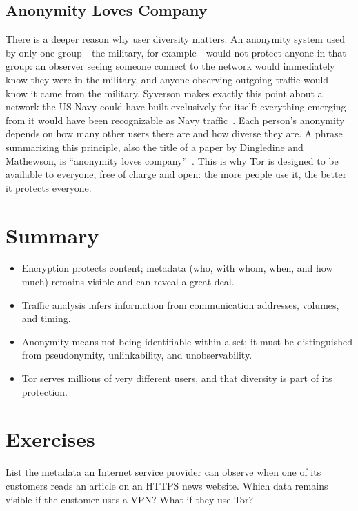 \subsection{Anonymity Loves Company}

There is a deeper reason why user diversity matters. An anonymity system used by only one group---the military, for example---would not protect anyone in that group: an observer seeing someone connect to the network would immediately know they were in the military, and anyone observing outgoing traffic would know it came from the military. Syverson makes exactly this point about a network the US Navy could have built exclusively for itself: everything emerging from it would have been recognizable as Navy traffic~\cite{syverson2011peel}. Each person's anonymity depends on how many other users there are and how diverse they are. A phrase summarizing this principle, also the title of a paper by Dingledine and Mathewson, is \enquote{anonymity loves company}~\cite{dingledine2006company}. This is why Tor is designed to be available to everyone, free of charge and open: the more people use it, the better it protects everyone.

\section*{Summary}
\begin{itemize}
  \item Encryption protects content; metadata (who, with whom, when, and how much) remains visible and can reveal a great deal.
  \item Traffic analysis infers information from communication addresses, volumes, and timing.
  \item Anonymity means not being identifiable within a set; it must be distinguished from pseudonymity, unlinkability, and unobservability.
  \item Tor serves millions of very different users, and that diversity is part of its protection.
\end{itemize}

\section*{Exercises}

\begin{esercizio}[1]\label{es:01-metadati}
List the metadata an Internet service provider can observe when one of its customers reads an article on an HTTPS news website. Which data remains visible if the customer uses a VPN? What if they use Tor?
\end{esercizio}

